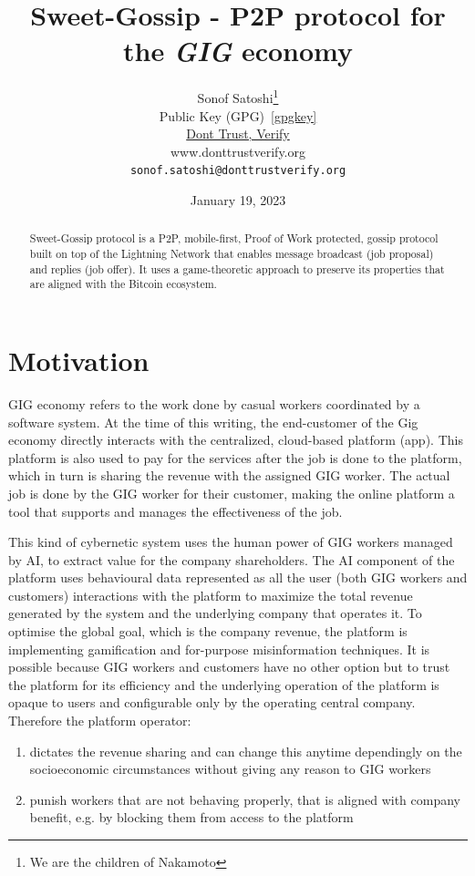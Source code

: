 \documentclass{article}
\title{Sweet-Gossip - P2P protocol for the \emph{GIG} economy}
\date{January 19, 2023}
\author{
	{Sonof Satoshi}\thanks{We are the children of Nakamoto} \\
	Public Key (GPG)~\ref{gpgkey} \\
	\href{www.donttrustverify.org}{Dont Trust, Verify}\\
	www.donttrustverify.org \\
	\texttt{sonof.satoshi@donttrustverify.org}\\
}
\begin{document}
\maketitle

\begin{abstract}
Sweet-Gossip protocol is a P2P, mobile-first, Proof of Work protected, gossip protocol built on top of the Lightning Network that enables message broadcast (job proposal) and replies (job offer). It uses a game-theoretic approach to preserve its properties that are aligned with the Bitcoin ecosystem.
\end{abstract}




\section{Motivation}

GIG economy refers to the work done by casual workers coordinated by a software system. At the time of this writing, the end-customer of the Gig economy directly interacts with the centralized, cloud-based platform (app). This platform is also used to pay for the services after the job is done to the platform, which in turn is sharing the revenue with the assigned GIG worker. The actual job is done by the GIG worker for their customer, making the online platform a tool that supports and manages the effectiveness of the job.

This kind of cybernetic system uses the human power of GIG workers managed by AI, to extract value for the company shareholders. The AI component of the platform uses behavioural data represented as all the user (both GIG workers and customers) interactions with the platform to maximize the total revenue generated by the system and the underlying company that operates it. To optimise the global goal, which is the company revenue, the platform is implementing gamification and for-purpose misinformation techniques. It is possible because GIG workers and customers have no other option but to trust the platform for its efficiency and the underlying operation of the platform is opaque to users and configurable only by the operating central company. Therefore the platform operator:

\begin{enumerate}
\item dictates the revenue sharing and can change this anytime dependingly on the socioeconomic circumstances without giving any reason to GIG workers

\item punish workers that are not behaving properly, that is aligned with company benefit, e.g. by blocking them from access to the platform
\end{enumerate}
\end{document}

